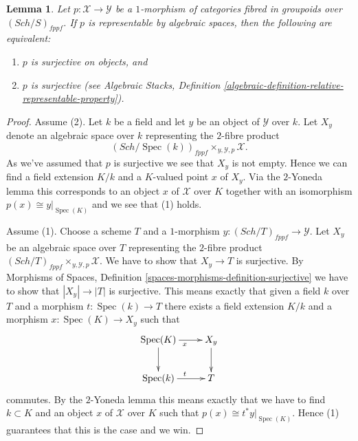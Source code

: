 \documentclass{stacks-project}
\theoremstyle{plain}
\newtheorem{lemma}[subsection]{Lemma}
\theoremstyle{definition}
\theoremstyle{remark}
\numberwithin{equation}{subsection}
\def\Spec{\mathop{\mathrm{Spec}}}
\def\Sch{\mathit{Sch}}
\begin{document}
\begin{lemma}
\label{lemma-representable-by-spaces-surjective}
Let $p : \mathcal{X} \to \mathcal{Y}$ be a $1$-morphism of categories
fibred in groupoids over $(\Sch/S)_{fppf}$. If $p$ is
representable by algebraic spaces, then the following are equivalent:
\begin{enumerate}
\item $p$ is surjective on objects, and
\item $p$ is surjective (see
Algebraic Stacks,
Definition \ref{algebraic-definition-relative-representable-property}).
\end{enumerate}
\end{lemma}

\begin{proof}
Assume (2). Let $k$ be a field and let $y$ be an object of
$\mathcal{Y}$ over $k$. Let $X_y$ denote an algebraic space over $k$
representing the $2$-fibre product
$$
(\Sch/\Spec(k))_{fppf} \times_{y, \mathcal{Y}, p} \mathcal{X}.
$$
As we've assumed that $p$ is surjective we see that $X_y$ is not empty.
Hence we can find a field extension $K/k$ and a $K$-valued point
$x$ of $X_y$. Via the $2$-Yoneda lemma this corresponds to an object
$x$ of $\mathcal{X}$ over $K$ together with an isomorphism
$p(x) \cong y|_{\Spec(K)}$ and we see that (1) holds.

\medskip\noindent
Assume (1). Choose a scheme $T$ and a $1$-morphism
$y : (\Sch/T)_{fppf} \to \mathcal{Y}$. Let
$X_y$ be an algebraic space over $T$ representing the $2$-fibre product
$(\Sch/T)_{fppf} \times_{y, \mathcal{Y}, p} \mathcal{X}$.
We have to show that $X_y \to T$ is surjective. By
Morphisms of Spaces, Definition \ref{spaces-morphisms-definition-surjective}
we have to show that $|X_y| \to |T|$ is surjective.
This means exactly that given a field $k$ over $T$ and a
morphism $t : \Spec(k) \to T$ there exists a field extension
$K/k$ and a morphism $x : \Spec(K) \to X_y$ such that
$$
\xymatrix{
\Spec(K) \ar[d] \ar[r]_x & X_y \ar[d] \\
\Spec(k) \ar[r]^t & T
}
$$
commutes. By the $2$-Yoneda lemma this means exactly that we have to find
$k \subset K$ and an object $x$ of $\mathcal{X}$ over $K$ such that
$p(x) \cong t^*y|_{\Spec(K)}$. Hence (1) guarantees that this is
the case and we win.
\end{proof}
\end{document}
